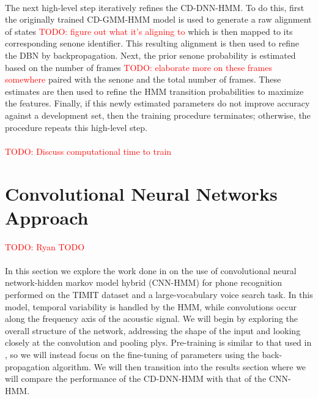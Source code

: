 \documentclass[letterpaper]{article}
\newcommand{\TODO}[1]{\textcolor{red}{TODO: #1}}
\begin{document}
\paragraph{} The next high-level step iteratively refines the CD-DNN-HMM. To do this, first the originally trained CD-GMM-HMM model is used to generate a raw alignment of states \TODO{figure out what it's aligning to} which is then mapped to its corresponding senone identifier. This resulting alignment is then used to refine the DBN by backpropagation. Next, the prior senone probability is estimated based on the number of frames \TODO{elaborate more on these frames somewhere} paired with the senone and the total number of frames. These estimates are then used to refine the HMM transition probabilities to maximize the features. Finally, if this newly estimated parameters do not improve accuracy against a development set, then the training procedure terminates; otherwise, the procedure repeats this high-level step.

\paragraph{} \TODO{Discuss computational time to train}

\section*{Convolutional Neural Networks Approach} \TODO{Ryan TODO}

\paragraph{} In this section we explore the work done in \cite{DBLP:journals/taslp/Abdel-HamidMJDPY14} on the use of convolutional neural network-hidden markov model hybrid (CNN-HMM) for phone recognition performed on the TIMIT dataset and a large-vocabulary voice search task. In this model, temporal variability is handled by the HMM, while convolutions occur along the frequency axis of the acoustic signal. We will begin by exploring the overall structure of the network, addressing the shape of the input and looking closely at the convolution and pooling plys. Pre-training is similar to that used in \cite{DBLP:journals/taslp/DahlYDA12}, so we will instead focus on the fine-tuning of  parameters using the back-propagation algorithm. We will then transition into the results section where we will compare the performance of the CD-DNN-HMM with that of the CNN-HMM.
\end{document}
